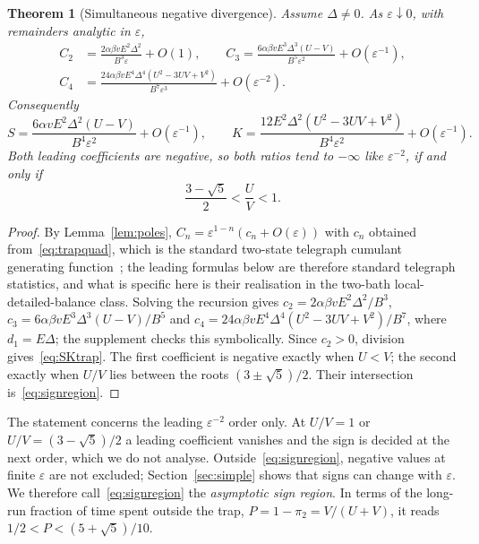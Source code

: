 \documentclass[11pt,a4paper]{article}
\newtheorem{theorem}{Theorem}[section]
\theoremstyle{remark}\newtheorem{remark}[theorem]{Remark}
\newcommand{\eps}{\varepsilon}
\begin{document}
\begin{theorem}[Simultaneous negative divergence]\label{thm:trap}
Assume $\Delta\ne0$. As $\eps\downarrow0$, with remainders analytic in $\eps$,
\begin{align}
C_2&=\frac{2\alpha\beta vE^2\Delta^2}{B^3\eps}+O(1),\qquad
C_3=\frac{6\alpha\beta vE^3\Delta^3(U-V)}{B^5\eps^2}+O(\eps^{-1}),\nonumber\\
C_4&=\frac{24\alpha\beta vE^4\Delta^4(U^2-3UV+V^2)}{B^7\eps^3}+O(\eps^{-2}).\label{eq:trapleading}
\end{align}
Consequently
\begin{equation}\label{eq:SKtrap}
S=\frac{6\alpha vE^2\Delta^2(U-V)}{B^4\eps^2}+O(\eps^{-1}),\qquad
K=\frac{12E^2\Delta^2(U^2-3UV+V^2)}{B^4\eps^2}+O(\eps^{-1}).
\end{equation}
Both leading coefficients are negative, so both ratios tend to $-\infty$ like $\eps^{-2}$, if and only if
\begin{equation}\label{eq:signregion}
\frac{3-\sqrt5}{2}<\frac UV<1.
\end{equation}
\end{theorem}
\begin{proof}
By Lemma~\ref{lem:poles}, $C_n=\eps^{1-n}(c_n+O(\eps))$ with $c_n$ obtained from~\eqref{eq:trapquad}, which is the standard two-state telegraph cumulant generating function~\cite{Jordan2004,BagretsNazarov2003}; the leading formulas below are therefore standard telegraph statistics, and what is specific here is their realisation in the two-bath local-detailed-balance class. Solving the recursion gives $c_2=2\alpha\beta vE^2\Delta^2/B^3$, $c_3=6\alpha\beta vE^3\Delta^3(U-V)/B^5$ and $c_4=24\alpha\beta vE^4\Delta^4(U^2-3UV+V^2)/B^7$, where $d_1=E\Delta$; the supplement checks this symbolically. Since $c_2>0$, division gives~\eqref{eq:SKtrap}. The first coefficient is negative exactly when $U<V$; the second exactly when $U/V$ lies between the roots $(3\pm\sqrt5)/2$. Their intersection is~\eqref{eq:signregion}.
\end{proof}

The statement concerns the leading $\eps^{-2}$ order only. At $U/V=1$ or $U/V=(3-\sqrt5)/2$ a leading coefficient vanishes and the sign is decided at the next order, which we do not analyse. Outside~\eqref{eq:signregion}, negative values at finite $\eps$ are not excluded; Section~\ref{sec:simple} shows that signs can change with $\eps$. We therefore call~\eqref{eq:signregion} the \emph{asymptotic sign region}. In terms of the long-run fraction of time spent outside the trap, $P=1-\pi_2=V/(U+V)$, it reads $1/2<P<(5+\sqrt5)/10$.
\end{document}
